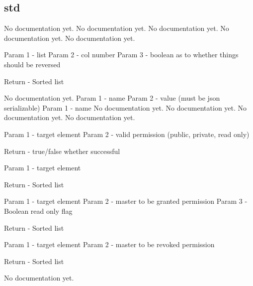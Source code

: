 \subsection{std}
\par
No documentation yet.
{No documentation yet.}
{No documentation yet.}
{No documentation yet.}
{No documentation yet.}
{Param 1 - list
Param 2 - col number
Param 3 - boolean as to whether things should be reversed

Return - Sorted list}
{No documentation yet.}
{Param 1 - name
Param 2 - value (must be json serializable)}
{Param 1 - name}
{No documentation yet.}
{No documentation yet.}
{No documentation yet.}
{No documentation yet.}
{Param 1 - target element
Param 2 - valid permission (public, private, read only)

Return - true/false whether successful}
{Param 1 - target element

Return - Sorted list}
{Param 1 - target element
Param 2 - master to be granted permission
Param 3 - Boolean read only flag

Return - Sorted list}
{Param 1 - target element
Param 2 - master to be revoked permission

Return - Sorted list}
{No documentation yet.}

